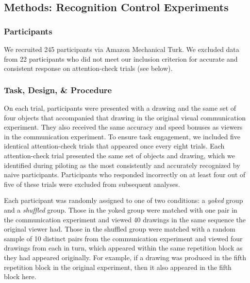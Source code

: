 \documentclass[10pt,letterpaper]{article}
\begin{document}
\subsection{Methods: Recognition Control Experiments}

\subsubsection{Participants}

We recruited 245 participants via Amazon Mechanical Turk.
We excluded data from 22 participants who did not meet our inclusion criterion for accurate and consistent response on attention-check trials (see below).

\subsubsection{Task, Design, \& Procedure}

On each trial, participants were presented with a drawing and the same set of four objects that accompanied that drawing in the original visual communication experiment.
They also received the same accuracy and speed bonuses as viewers in the communication experiment.
To ensure task engagement, we included five identical attention-check trials that appeared once every eight trials.
Each attention-check trial presented the same set of objects and drawing, which we identified during piloting as the most consistently and accurately recognized by naive participants.
Participants who responded incorrectly on at least four out of five of these trials were excluded from subsequent analyses.

Each participant was randomly assigned to one of two conditions: a \textit{yoked} group and a \textit{shuffled} group.
Those in the yoked group were matched with one pair in the communication experiment and viewed 40 drawings in the same sequence the original viewer had.
Those in the shuffled group were matched with a random sample of 10 distinct pairs from the communication experiment and viewed four drawings from each in turn, which appeared within the same repetition block as they had appeared originally.
For example, if a drawing was produced in the fifth repetition block in the original experiment, then it also appeared in the fifth block here.
\end{document}
